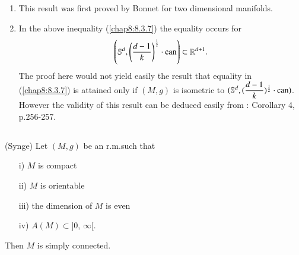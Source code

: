 \subsection{}\label{chap8:8.3.8}

\begin{remarks*}
\begin{enumerate}
\renewcommand{\labelenumi}{\theenumi)}
\item This result was first proved by Bonnet for two dimensional
  manifolds.

\item In the above inequality (\ref{chap8:8.3.7}) the equality occurs
  for
$$
\left(\mathbb{S}^{d},\left(\frac{d-1}{k}\right)^{\frac{1}{2}}\cdot
\operatorname{can}\right)\subset 
\mathbb{R}^{d+1}. 
$$
The proof here would not yield easily the result that equality in
(\ref{chap8:8.3.7}) is attained only if $(M,g)$ is isometric to
$(\mathbb{S}^{d}, (\dfrac{d-1}{k})^{\frac{1}{2}}\cdot \operatorname{can})$. However
the validity of this result can be deduced easily from \cite{33}:
Corollary 4, p.256-257.
\end{enumerate}
\end{remarks*}

\subsection{}\label{chap8:8.3.9}

\begin{theorem*}(Synge)
Let $(M,g)$ be an r.m.\@ such that 
\begin{itemize}
\item[\rm i)] $M$ is compact

\item[\rm ii)] $M$ is orientable

\item[\rm iii)] the dimension of $M$ is even

\item[\rm iv)] $A(M)\subset ]0$, $\infty [$.
\end{itemize}
Then $M$ is simply connected.
\end{theorem*}

